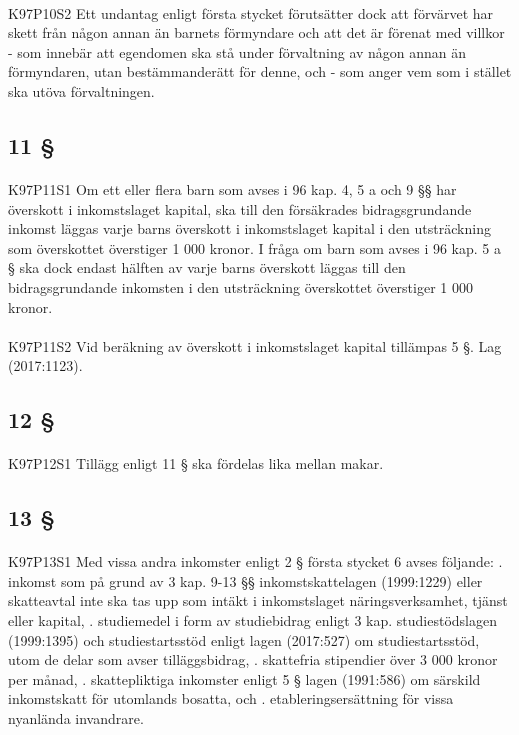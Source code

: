 \documentclass[a4paper,notitlepage,openany,10pt]{book}
\begin{document}
\paragraph*{}
{\tiny K97P10S2}
Ett undantag enligt första stycket förutsätter dock att förvärvet har skett från någon annan än barnets förmyndare och att det är förenat med villkor
\newline - som innebär att egendomen ska stå under förvaltning av någon annan än förmyndaren, utan bestämmanderätt för denne, och
\newline - som anger vem som i stället ska utöva förvaltningen.
\subsection*{11 §}
\paragraph*{}
{\tiny K97P11S1}
Om ett eller flera barn som avses i 96 kap. 4, 5 a och 9 §§ har överskott i inkomstslaget kapital, ska till den försäkrades bidragsgrundande inkomst läggas varje barns överskott i inkomstslaget kapital i den utsträckning som överskottet överstiger 1 000 kronor. I fråga om barn som avses i 96 kap. 5 a § ska dock endast hälften av varje barns överskott läggas till den bidragsgrundande inkomsten i den utsträckning överskottet överstiger 1 000 kronor.
\paragraph*{}
{\tiny K97P11S2}
Vid beräkning av överskott i inkomstslaget kapital tillämpas 5 §.
Lag (2017:1123).
\subsection*{12 §}
\paragraph*{}
{\tiny K97P12S1}
Tillägg enligt 11 § ska fördelas lika mellan makar.
\subsection*{13 §}
\paragraph*{}
{\tiny K97P13S1}
Med vissa andra inkomster enligt 2 § första stycket 6 avses följande:
. inkomst som på grund av 3 kap. 9-13 §§ inkomstskattelagen (1999:1229) eller skatteavtal inte ska tas upp som intäkt i inkomstslaget näringsverksamhet, tjänst eller kapital,
. studiemedel i form av studiebidrag enligt 3 kap. studiestödslagen (1999:1395) och studiestartsstöd enligt lagen (2017:527) om studiestartsstöd, utom de delar som avser tilläggsbidrag,
. skattefria stipendier över 3 000 kronor per månad,
. skattepliktiga inkomster enligt 5 § lagen (1991:586) om särskild inkomstskatt för utomlands bosatta, och
. etableringsersättning för vissa nyanlända invandrare.
\end{document}
